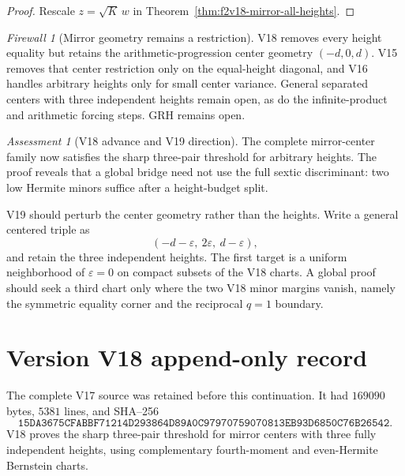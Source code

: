 \documentclass[11pt]{article}
\theoremstyle{definition}
\theoremstyle{remark}
\newtheorem{assessment}[theorem]{Assessment}
\newtheorem{firewall}[theorem]{Firewall}
\begin{document}
\begin{proof}
Rescale \(z=\sqrt K\,w\) in
Theorem~\ref{thm:f2v18-mirror-all-heights}.
\end{proof}

\begin{firewall}[Mirror geometry remains a restriction]
V18 removes every height equality but retains the arithmetic-progression
center geometry \((-d,0,d)\).  V15 removes that center restriction only on
the equal-height diagonal, and V16 handles arbitrary heights only for small
center variance.  General separated centers with three independent heights
remain open, as do the infinite-product and arithmetic forcing steps.  GRH
remains open.
\end{firewall}

\begin{assessment}[V18 advance and V19 direction]
The complete mirror-center family now satisfies the sharp three-pair
threshold for arbitrary heights.  The proof reveals that a global bridge
need not use the full sextic discriminant: two low Hermite minors suffice
after a height-budget split.

V19 should perturb the center geometry rather than the heights.  Write a
general centered triple as
\[
 (-d-\varepsilon,\ 2\varepsilon,\ d-\varepsilon),
 \tag{N18.30}
\]
and retain the three independent heights.  The first target is a uniform
neighborhood of \(\varepsilon=0\) on compact subsets of the V18 charts.
A global proof should seek a third chart only where the two V18 minor
margins vanish, namely the symmetric equality corner and the reciprocal
\(q=1\) boundary.
\end{assessment}

\section*{Version V18 append-only record}
The complete V17 source was retained before this continuation.  It had
\(169090\) bytes, \(5381\) lines, and SHA--256
\[
 \texttt{15DA3675CFABBF71214D293864D89A0C97970759070813EB93D6850C76B26542}.
\]
V18 proves the sharp three-pair threshold for mirror centers with three
fully independent heights, using complementary fourth-moment and
even-Hermite Bernstein charts.

\end{document}
